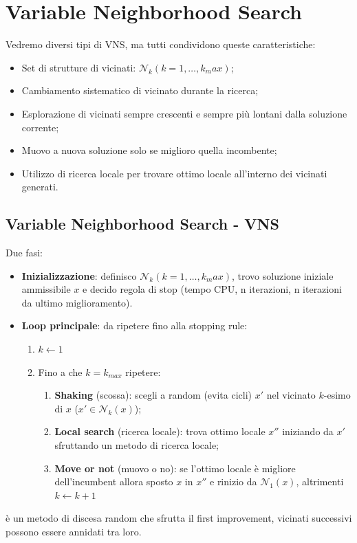 \section{Variable Neighborhood Search}
Vedremo diversi tipi di VNS, ma tutti condividono queste caratteristiche:
\begin{itemize}
	\item Set di strutture di vicinati: $\mathcal{N}_k(k=1,\dots,k_max)$;
	\item Cambiamento sistematico di vicinato durante la ricerca;
	\item Esplorazione di vicinati sempre crescenti e sempre più lontani dalla soluzione corrente;
	\item Muovo a nuova soluzione solo se miglioro quella incombente;
	\item Utilizzo di ricerca locale per trovare ottimo locale all'interno dei vicinati generati.
\end{itemize}
\subsection{Variable Neighborhood Search - VNS}
Due fasi:
\begin{itemize}
	\item \textbf{Inizializzazione}: definisco $\mathcal{N}_k(k=1,\dots,k_max)$, trovo soluzione iniziale ammissibile $x$ e decido regola di stop (tempo CPU, n iterazioni, n iterazioni da ultimo miglioramento).
	\item \textbf{Loop principale}: da ripetere fino alla stopping rule:
	\begin{enumerate}
		\item $k\leftarrow 1$
		\item Fino a che  $k=k_{max}$ ripetere:
		\begin{enumerate}
			\item \textbf{Shaking} (scossa): scegli a random (evita cicli) $x'$ nel vicinato $k$-esimo di $x$ ($x'\in \mathcal{N}_k(x)$);
			\item \textbf{Local search} (ricerca locale): trova ottimo locale $x''$ iniziando da $x'$ sfruttando un metodo di ricerca locale;
			\item \textbf{Move or not} (muovo o no): se l'ottimo locale è migliore dell'incumbent allora sposto $x$ in $x''$ e rinizio da $\mathcal{N}_1(x)$, altrimenti $k\leftarrow k+1$
		\end{enumerate}
	\end{enumerate}
\end{itemize}
è un metodo di discesa random che sfrutta il first improvement, vicinati successivi possono essere annidati tra loro.

